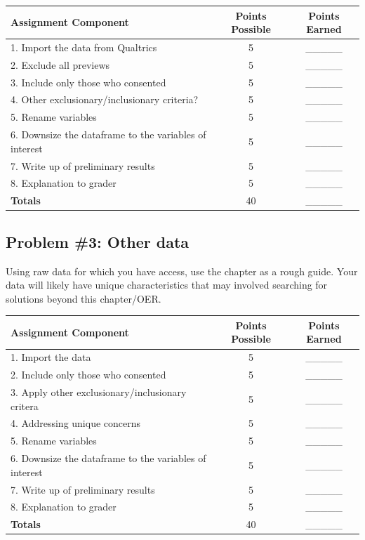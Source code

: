 \documentclass[
  english,
]{book}
\begin{document}
\begin{longtable}[]{@{}lcc@{}}
\toprule
Assignment Component & Points Possible & Points Earned \\
\midrule
\endhead
1. Import the data from Qualtrics & 5 & \_\_\_\_\_ \\
2. Exclude all previews & 5 & \_\_\_\_\_ \\
3. Include only those who consented & 5 & \_\_\_\_\_ \\
4. Other exclusionary/inclusionary criteria? & 5 & \_\_\_\_\_ \\
5. Rename variables & 5 & \_\_\_\_\_ \\
6. Downsize the dataframe to the variables of interest & 5 & \_\_\_\_\_ \\
7. Write up of preliminary results & 5 & \_\_\_\_\_ \\
8. Explanation to grader & 5 & \_\_\_\_\_ \\
\textbf{Totals} & 40 & \_\_\_\_\_ \\
\bottomrule
\end{longtable}

\hypertarget{problem-3-other-data}{%
\subsection{Problem \#3: Other data}\label{problem-3-other-data}}

Using raw data for which you have access, use the chapter as a rough guide. Your data will likely have unique characteristics that may involved searching for solutions beyond this chapter/OER.

\begin{longtable}[]{@{}lcc@{}}
\toprule
Assignment Component & Points Possible & Points Earned \\
\midrule
\endhead
1. Import the data & 5 & \_\_\_\_\_ \\
2. Include only those who consented & 5 & \_\_\_\_\_ \\
3. Apply other exclusionary/inclusionary critera & 5 & \_\_\_\_\_ \\
4. Addressing unique concerns & 5 & \_\_\_\_\_ \\
5. Rename variables & 5 & \_\_\_\_\_ \\
6. Downsize the dataframe to the variables of interest & 5 & \_\_\_\_\_ \\
7. Write up of preliminary results & 5 & \_\_\_\_\_ \\
8. Explanation to grader & 5 & \_\_\_\_\_ \\
\textbf{Totals} & 40 & \_\_\_\_\_ \\
\bottomrule
\end{longtable}
\end{document}
